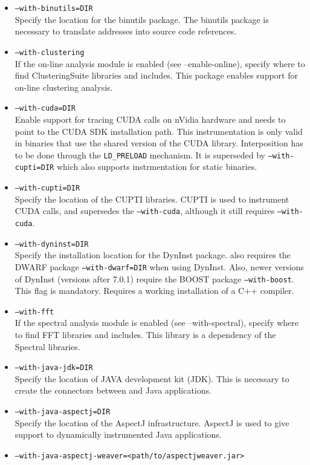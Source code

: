 \begin{itemize}
	\item {\tt --with-binutils=DIR} \\
	Specify the location for the binutils package. The binutils package is necessary to translate addresses into source code references.
        \item {\tt --with-clustering} \\
        If the on-line analysis module is enabled (see --enable-online), specify where to find ClusteringSuite libraries and includes. This package enables support for on-line clustering analysis.
	\item {\tt --with-cuda=DIR} \\
	Enable support for tracing CUDA calls on nVidia hardware and needs to point to the CUDA SDK installation path. This instrumentation is only valid in binaries that use the shared version of the CUDA library. Interposition has to be done through the {\tt LD\_PRELOAD} mechanism. It is superseded by {\tt --with-cupti=DIR} which also supports instrmentation for static binaries.
	\item {\tt --with-cupti=DIR} \\
	Specify the location of the CUPTI libraries. CUPTI is used to instrument CUDA calls, and supersedes the {\tt --with-cuda}, although it still requires {\tt --with-cuda}.
	\item {\tt --with-dyninst=DIR} \\
	Specify the installation location for the DynInst package. \TRACE also requires the DWARF package {\tt --with-dwarf=DIR} when using DynInst. Also, newer versions of DynInst (versions after 7.0.1) require the BOOST package {\tt --with-boost}. This flag is mandatory. Requires a working installation of a C++ compiler.
        \item {\tt --with-fft} \\
        If the spectral analysis module is enabled (see --with-spectral), specify where to find FFT libraries and includes. This library is a dependency of the Spectral libraries.
	\item \texttt{--with-java-jdk=DIR} \\
	Specify the location of JAVA development kit (JDK). This is necessary to create the connectors between \TRACE and Java applications.
    \item \texttt{--with-java-aspectj=DIR} \\
    Specify the location of the AspectJ infrastructure. AspectJ is used to give support to dynamically instrumented Java applications.
    \item \texttt{--with-java-aspectj-weaver=<path/to/aspectjweaver.jar>} \\

\end{itemize}
